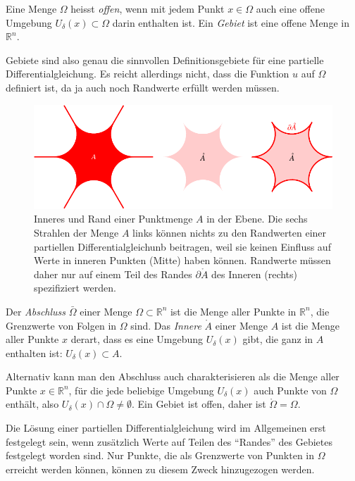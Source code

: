 \begin{definition}
Eine Menge $\Omega$ heisst {\em offen}, wenn mit jedem Punkt $x\in \Omega$
auch eine offene Umgebung $U_{\delta}(x)\subset\Omega$ darin enthalten ist.
Ein {\em Gebiet} ist eine offene Menge in $\mathbb R^n$.
\end{definition}

Gebiete sind also genau die sinnvollen Definitionsgebiete für eine partielle
Differentialgleichung.
Es reicht allerdings nicht, dass die Funktion $u$ auf $\Omega$ definiert
ist, da ja auch noch Randwerte erfüllt werden müssen.

\begin{figure}
\centering
\includegraphics{chapters/70-pde/images/gebiet.pdf}
\caption{Inneres und Rand einer Punktmenge $A$ in der Ebene.
Die sechs Strahlen der Menge $A$ links können nichts zu den Randwerten
einer partiellen Differentialgleichunb beitragen, weil sie keinen
Einfluss auf Werte in inneren Punkten (Mitte) haben können.
Randwerte müssen daher nur auf einem Teil des Randes $\partial\mathring{A}$
des Inneren (rechts) spezifiziert werden.
\label{buch:pde:figure:gebiet}}
\end{figure}

\begin{definition}
Der {\em Abschluss} $\bar{\Omega}$ einer Menge $\Omega\subset\mathbb R^n$ ist
die Menge aller Punkte in $\mathbb R^n$, die Grenzwerte von Folgen in
$\Omega$ sind.
Das {\em Innere} $\mathring{A}$ einer Menge $A$ ist die Menge aller Punkte
$x$ derart, dass es eine Umgebung $U_\delta(x)$ gibt, die ganz in $A$
enthalten ist: $U_{\delta}(x)\subset A$.
\end{definition}

Alternativ kann man den Abschluss auch charakterisieren als die Menge
aller Punkte $x\in\mathbb R^n$, für die jede beliebige Umgebung
$U_\delta(x)$ auch Punkte von $\Omega$ enthält, also
$U_\delta(x)\cap \Omega\ne \emptyset$.
Ein Gebiet ist offen, daher ist $\mathring\Omega=\Omega$.

Die Lösung einer partiellen Differentialgleichung wird im Allgemeinen erst
festgelegt sein, wenn zusätzlich Werte auf Teilen des ``Randes'' des
Gebietes festgelegt worden sind.
Nur Punkte, die als Grenzwerte von Punkten in $\Omega$ erreicht werden
können, können zu diesem Zweck hinzugezogen werden.

